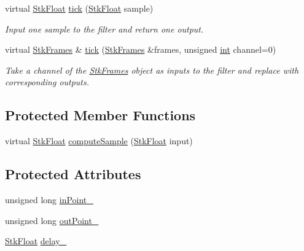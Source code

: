 \begin{DoxyCompactItemize}
virtual \hyperlink{namespace_nyq_a044fa20a706520a617bbbf458a7db7e4}{Stk\+Float} \hyperlink{class_nyq_1_1_delay_a1ca7b9275f434e1f1b1808c2dc8b461f}{tick} (\hyperlink{namespace_nyq_a044fa20a706520a617bbbf458a7db7e4}{Stk\+Float} sample)
\begin{DoxyCompactList}\small\item\em Input one sample to the filter and return one output. \end{DoxyCompactList}\item 
virtual \hyperlink{class_nyq_1_1_stk_frames}{Stk\+Frames} \& \hyperlink{class_nyq_1_1_delay_ac3b3937a9371f4c1efab2c05e393e2c6}{tick} (\hyperlink{class_nyq_1_1_stk_frames}{Stk\+Frames} \&frames, unsigned \hyperlink{xmltok_8h_a5a0d4a5641ce434f1d23533f2b2e6653}{int} channel=0)
\begin{DoxyCompactList}\small\item\em Take a channel of the \hyperlink{class_nyq_1_1_stk_frames}{Stk\+Frames} object as inputs to the filter and replace with corresponding outputs. \end{DoxyCompactList}\end{DoxyCompactItemize}
\subsection*{Protected Member Functions}
\begin{DoxyCompactItemize}
\item 
virtual \hyperlink{namespace_nyq_a044fa20a706520a617bbbf458a7db7e4}{Stk\+Float} \hyperlink{class_nyq_1_1_delay_af3d4263964cf36ffef541c3246e40478}{compute\+Sample} (\hyperlink{namespace_nyq_a044fa20a706520a617bbbf458a7db7e4}{Stk\+Float} input)
\end{DoxyCompactItemize}
\subsection*{Protected Attributes}
\begin{DoxyCompactItemize}
\item 
unsigned long \hyperlink{class_nyq_1_1_delay_ac5deb6e923f40803da4dbfafc6d522ea}{in\+Point\+\_\+}
\item 
unsigned long \hyperlink{class_nyq_1_1_delay_a978ec66eae70e6da71854411421fe857}{out\+Point\+\_\+}
\item 
\hyperlink{namespace_nyq_a044fa20a706520a617bbbf458a7db7e4}{Stk\+Float} \hyperlink{class_nyq_1_1_delay_af2a95a6acc9b4073b670e23994351699}{delay\+\_\+}
\end{DoxyCompactItemize}


